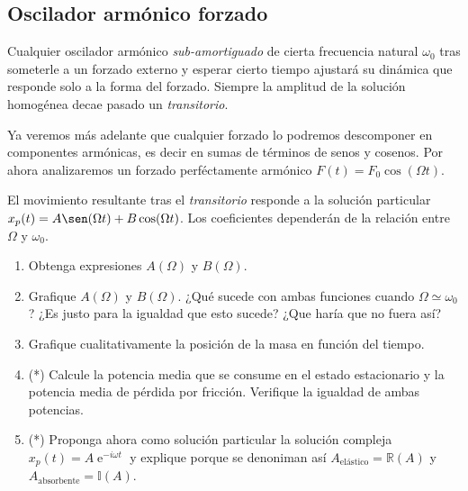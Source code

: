 \subsection*{Oscilador armónico forzado}
\item Cualquier oscilador armónico \emph{sub-amortiguado} de cierta frecuencia natural \(\omega_0\) tras someterle a un forzado externo y esperar cierto tiempo ajustará su dinámica que responde solo a la forma del forzado.
Siempre la amplitud de la solución homogénea decae pasado un \emph{transitorio}. 

Ya veremos más adelante que cualquier forzado lo podremos descomponer en componentes armónicas, es decir en sumas de términos de senos y cosenos.
Por ahora analizaremos un forzado perféctamente armónico \(F(t) = F_0 \cos(\Omega t)\).

El movimiento resultante tras el \emph{transitorio} responde a la solución particular $x_p(t) = A \sen(\Omega t) + B \cos(\Omega t)$.
Los coeficientes dependerán de la relación entre \(\Omega\) y \(\omega_0\).

\begin{enumerate}
	\item Obtenga expresiones $A(\Omega)$ y $B(\Omega)$.
	\item Grafique $A(\Omega)$ y $B(\Omega)$. ¿Qué sucede con ambas funciones cuando \(\Omega \simeq \omega_0\)? ¿Es justo para la igualdad que esto sucede? ¿Que haría que no fuera así? 
	\item Grafique cualitativamente la posición de la masa en función del tiempo. 
	\item (*) Calcule la potencia media que se consume en el estado estacionario y la potencia media de pérdida por fricción.
	Verifique la igualdad de ambas potencias.
	\item (*) Proponga ahora como solución particular la solución compleja \(x_p(t) = A \operatorname{e}^{-i \omega t}\) y explique porque se denoniman así \(A_\text{elástico} = \mathbb{R} (A)\) y \(A_\text{absorbente} = \mathbb{I} (A)\).
\end{enumerate}



